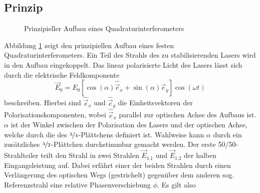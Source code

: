 \subsection{Prinzip}\label{subsec:quadraturinterferometer_prinzip}
\begin{figure}[h]
 	\centering
	\caption[Quadraturinterferometer - prinzipieller Aufbau]{Prinzipieller
	Aufbau eines
	Quadraturinterferometers}\label{fig:quadraturinterferometer_aufbau}
\end{figure}
Abbildung \ref{fig:quadraturinterferometer_aufbau} zeigt den prinzipiellen
Aufbau eines festen Quadraturinterferometers. Ein Teil des Strahls des zu stabilisierenden
Lasers wird in den Aufbau eingekoppelt. Das linear polarisierte
Licht des Lasers lässt sich durch die elektrische Feldkomponente
\begin{equation}\label{eq:quadraturinterfferometer_01}
	\vec{E}_0=E_0\left[\cos{(\alpha)}\hat{\vec{e}}_x+\sin{(\alpha)}\hat{\vec{e}}_y\right]\cos{(\omega
	t)}
\end{equation}
beschreiben. Hierbei sind $\hat{\vec{e}}_x$ und $\hat{\vec{e}}_y$ die
Einheitsvektoren der Polarisationskomponenten, wobei $\hat{\vec{e}}_x$ parallel
zur optischen Achse des Aufbaus ist. $\alpha$ ist der Winkel zwischen der
Polarisation des Lasers und der optischen Achse, welche durch die des
$\nicefrac{\lambda}{4}$-Plättchens definiert ist. Wahlweise kann $\alpha$ durch
ein zusätzliches $\nicefrac{\lambda}{2}$-Plättchen durchstimmbar gemacht werden.
Der erste 50/50-Strahlteiler teilt den Strahl in zwei Strahlen $\vec{E}_{1.1}$
und $\vec{E}_{1.2}$ der halben Eingangsleistung auf. Dabei erfährt einer der
beiden Strahlen durch einen Verlängerung des optischen Wegs (gestrichelt)
gegenüber dem anderen sog.
Referenzstrahl eine relative Phasenverschiebung $\phi$. Es gilt also
